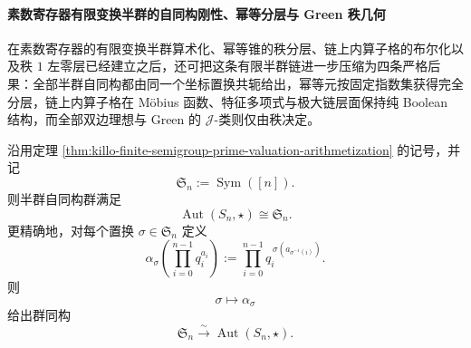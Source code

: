 \paragraph{素数寄存器有限变换半群的自同构刚性、幂等分层与 Green 秩几何}
在素数寄存器的有限变换半群算术化、幂等锥的秩分层、链上内算子格的布尔化以及秩 \(1\) 左零层已经建立之后，还可把这条有限半群链进一步压缩为四条严格后果：全部半群自同构都由同一个坐标置换共轭给出，幂等元按固定指数集获得完全分层，链上内算子格在 Möbius 函数、特征多项式与极大链层面保持纯 Boolean 结构，而全部双边理想与 Green 的 \(\mathcal J\)-类则仅由秩决定。

\begin{theorem}[素数寄存器变换半群的自同构群完全刚性]\label{thm:xi-prime-register-semigroup-automorphism-rigidity}
沿用定理 \ref{thm:killo-finite-semigroup-prime-valuation-arithmetization} 的记号，并记
\[
\mathfrak S_n:=\operatorname{Sym}([n]).
\]
则半群自同构群满足
\[
\boxed{\;
\operatorname{Aut}(S_n,\star)\cong \mathfrak S_n.\;}
\]
更精确地，对每个置换 \(\sigma\in \mathfrak S_n\) 定义
\[
\alpha_\sigma\!\left(\prod_{i=0}^{n-1}q_i^{a_i}\right)
:=
\prod_{i=0}^{n-1}q_i^{\,\sigma(a_{\sigma^{-1}(i)})}.
\]
则
\[
\boxed{\;
\sigma\longmapsto \alpha_\sigma
\;}
\]
给出群同构
\[
\mathfrak S_n\xrightarrow{\sim}\operatorname{Aut}(S_n,\star).
\]
\end{theorem}
